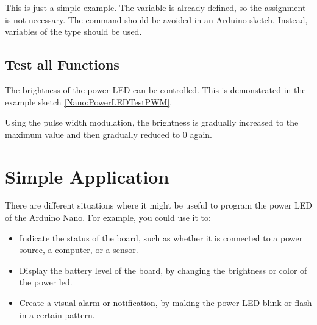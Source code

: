 {
  \label{Nano:PowerLEDTest}
}

\bigskip

This is just a simple example. The variable  is already defined, so the assignment is not necessary. The command  should be avoided in an Arduino sketch. Instead, variables of the type  should be used. \cite{ArduinoLanguage:2024}





\subsection{Test all Functions}

The brightness of the power LED can be controlled. This is demonstrated in the example sketch \ref{Nano:PowerLEDTestPWM}.

Using the pulse width modulation, the brightness is gradually increased to the maximum value and then gradually reduced to 0 again.




{
    \label{Nano:PowerLEDTestPWM}
}



\section{Simple Application}

There are different situations where it might be useful to program the power LED of the Arduino Nano. For example, you could use it to:

\begin{itemize}
    \item Indicate the status of the board, such as whether it is connected to a power source, a computer, or a sensor.
    \item  Display the battery level of the board, by changing the brightness or color of the power \ac{led}.
    \item Create a visual alarm or notification, by making the power LED blink or flash in a certain pattern.
\end{itemize}


